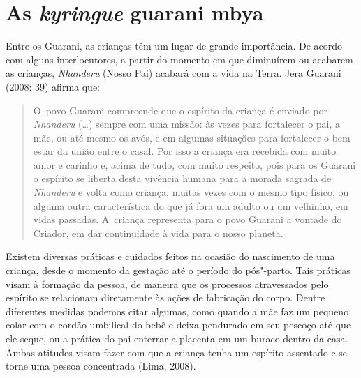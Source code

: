 \section{As \emph{kyringue} guarani mbya}
Entre os Guarani, as crianças têm um lugar de grande importância. De
acordo com alguns interlocutores, a partir do momento em que diminuírem
ou acabarem as crianças, \emph{Nhanderu} (Nosso Pai) acabará com a vida na
Terra. Jera Guarani (2008: 39) afirma que:

\begin{quote}
\noindent
O~povo Guarani compreende que o espírito da criança é enviado por
\emph{Nhanderu} (\ldots{}) sempre com uma missão: às vezes para fortalecer o pai, a
mãe, ou até mesmo os avós, e em algumas situações para fortalecer o bem
estar da união entre o casal. Por isso a criança era recebida com muito
amor e carinho e, acima de tudo, com muito respeito, pois para os
Guarani o espírito se liberta desta vivência humana para a morada
sagrada de \emph{Nhanderu} e volta como criança, muitas vezes com o mesmo tipo
físico, ou alguma outra característica do que já fora um adulto ou um
velhinho, em vidas passadas. A~criança representa para o povo Guarani a
vontade do Criador, em dar continuidade à vida para o nosso planeta.
\end{quote}

Existem diversas práticas e cuidados feitos na ocasião do nascimento de
uma criança, desde o momento da gestação até o período do pós"-parto.
Tais práticas visam à formação da pessoa, de maneira que os processos
atravessados pelo espírito se relacionam diretamente às ações de
fabricação do corpo. Dentre diferentes medidas podemos citar algumas,
como quando a mãe faz um pequeno colar com o cordão umbilical do bebê e
deixa pendurado em seu pescoço até que ele seque, ou a prática do pai
enterrar a placenta em um buraco dentro da casa. Ambas atitudes visam
fazer com que a criança tenha um espírito assentado e se torne uma
pessoa concentrada (Lima, 2008).

